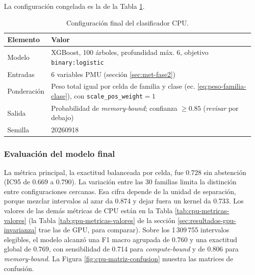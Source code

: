 La configuración congelada es la de la Tabla \ref{tab:cpu-configuracion-final}.
\begin{table}[H]
\centering
\caption{Configuración final del clasificador CPU.}
\label{tab:cpu-configuracion-final}
\footnotesize %
\setlength{\tabcolsep}{4pt} %
\begin{tabular}{@{}p{4.2cm}p{7.5cm}@{}}
\toprule
\textbf{Elemento} & \textbf{Valor} \\
\midrule
Modelo & XGBoost, 100 árboles, profundidad máx. 6, objetivo \texttt{binary:logistic} \\
Entradas & 6 variables PMU (sección \ref{sec:met-fase2}) \\
Ponderación & Peso total igual por celda de familia y clase (ec. \eqref{eq:peso-familia-clase}), con \texttt{scale\_pos\_weight}${}=1$ \\
Salida & Probabilidad de \textit{memory-bound}; confianza $\geq 0.85$ (\textit{revisar} por debajo) \\
Semilla & 20260918 \\
\bottomrule
\end{tabular}
\end{table}

\subsubsection{Evaluación del modelo final}
\label{sec:resultados-cpu-final}

La métrica principal, la exactitud balanceada por celda, fue 0.728 sin abstención (IC95 de 0.669 a 0.790). La variación entre las 30 familias limita la distinción entre configuraciones cercanas. Esa cifra depende de la unidad de separación, porque mezclar intervalos al azar da 0.874 y dejar fuera un kernel da 0.733. Los valores de las demás métricas de CPU están en la Tabla \ref{tab:cpu-metricas-valores} (la Tabla \ref{tab:gpu-metricas-valores} de la sección \ref{sec:resultados-gpu-invarianza} trae las de GPU, para comparar). Sobre los 1\,309\,755 intervalos elegibles, el modelo alcanzó una F1 macro agrupada de 0.760 y una exactitud global de 0.769, con sensibilidad de 0.714 para \textit{compute-bound} y de 0.806 para \textit{memory-bound}. La Figura \ref{fig:cpu-matriz-confusion} muestra las matrices de confusión.

